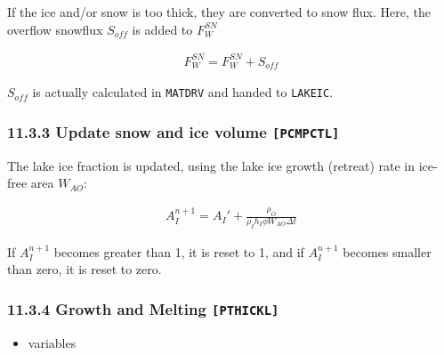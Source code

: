 If the ice and/or snow is too thick, they are converted to snow flux.
Here, the overflow snowflux \(S_{off}\) is added to \({F_W^{SN}}\)

\begin{eqnarray}
    F_W^{SN} = F_W^{SN} + S_{off}
\end{eqnarray}

\(S_{off}\) is actually calculated in \texttt{MATDRV} and handed to
\texttt{LAKEIC}.

\hypertarget{update-snow-and-ice-volume-pcmpctl}{%
\subsubsection{\texorpdfstring{11.3.3 Update snow and ice volume
\texttt{{[}PCMPCTL{]}}}{11.3.3 Update snow and ice volume {[}PCMPCTL{]}}}\label{update-snow-and-ice-volume-pcmpctl}}

The lake ice fraction is updated, using the lake ice growth (retreat)
rate in ice-free area \(W_{AO}\):

\begin{eqnarray}
    {A_I^{n+1}} = {A_I'} +\frac{\rho_O }{\rho_I h_I \phi W_{AO}\Delta t}
\end{eqnarray}

If \(A_I^{n+1}\) becomes greater than 1, it is reset to 1, and if
\(A_I^{n+1}\) becomes smaller than zero, it is reset to zero.

\hypertarget{growth-and-melting-pthickl}{%
\subsubsection{\texorpdfstring{11.3.4 Growth and Melting
\texttt{{[}PTHICKL{]}}}{11.3.4 Growth and Melting {[}PTHICKL{]}}}\label{growth-and-melting-pthickl}}

\begin{itemize}
\tightlist
\item
  variables
\end{itemize}

